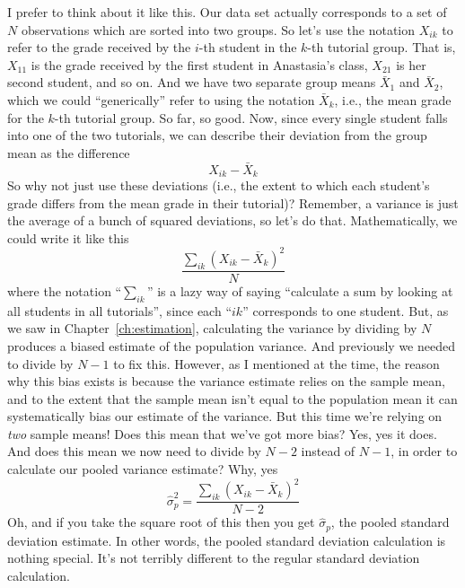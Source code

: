 
I prefer to think about it like this. Our data set actually corresponds to a set of $N$ observations which are sorted into two groups. So let's use the notation $X_{ik}$ to refer to the grade received by the $i$-th student in the $k$-th tutorial group. That is, $X_{11}$ is the grade received by the first student in Anastasia's class, $X_{21}$ is her second student, and so on. And we have two separate group means $\bar{X}_1$ and $\bar{X}_2$, which we could ``generically'' refer to using the notation $\bar{X}_k$, i.e., the mean grade for the $k$-th tutorial group. So far, so good. Now, since every single student falls into one of the two tutorials, we can describe their deviation from the group mean as the difference
$$
X_{ik} - \bar{X}_k
$$
So why not just use these deviations (i.e., the extent to which each student's grade differs from the mean grade in their tutorial)? Remember, a variance is just the average of a bunch of squared deviations, so let's do that. Mathematically, we could write it like this
$$
\frac{\sum_{ik} \left( X_{ik} - \bar{X}_k \right)^2}{N}
$$
where the notation ``$\sum_{ik}$'' is a lazy way of saying ``calculate a sum by looking at all students in all tutorials'', since each ``$ik$'' corresponds to one student. But, as we saw in Chapter~\ref{ch:estimation}, calculating the variance by dividing by $N$ produces a biased estimate of the population variance. And previously we needed to divide by $N-1$ to fix this. However, as I mentioned at the time, the reason why this bias exists is because the variance estimate relies on the sample mean, and to the extent that the sample mean isn't equal to the population mean it can systematically bias our estimate of the variance. But this time we're relying on {\it two} sample means! Does this mean that we've got more bias? Yes, yes it does. And does this mean we now need to divide by $N-2$ instead of $N-1$, in order to calculate our pooled variance estimate? Why, yes
$$
\hat\sigma^2_p = \frac{\sum_{ik} \left( X_{ik} - \bar{X}_k \right)^2}{N -2}
$$
Oh, and if you take the square root of this then you get $\hat{\sigma}_p$, the pooled standard deviation estimate. In other words, the pooled standard deviation calculation is nothing special. It's not terribly different to the regular standard deviation calculation. 


